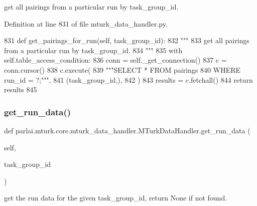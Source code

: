 \begin{DoxyVerb}get all pairings from a particular run by task_group_id.
\end{DoxyVerb}
 

Definition at line 831 of file mturk\+\_\+data\+\_\+handler.\+py.


\begin{DoxyCode}
831     \textcolor{keyword}{def }get\_pairings\_for\_run(self, task\_group\_id):
832         \textcolor{stringliteral}{"""}
833 \textcolor{stringliteral}{        get all pairings from a particular run by task\_group\_id.}
834 \textcolor{stringliteral}{        """}
835         with self.table\_access\_condition:
836             conn = self.\_get\_connection()
837             c = conn.cursor()
838             c.execute(
839                 \textcolor{stringliteral}{"""SELECT * FROM pairings}
840 \textcolor{stringliteral}{                         WHERE run\_id = ?;"""},
841                 (task\_group\_id,),
842             )
843             results = c.fetchall()
844             \textcolor{keywordflow}{return} results
845 
\end{DoxyCode}
\mbox{\label{classparlai_1_1mturk_1_1core_1_1mturk__data__handler_1_1MTurkDataHandler_a3ded92bcc9f19027c452489e2b06d837}} 
\subsubsection{\texorpdfstring{get\+\_\+run\+\_\+data()}{get\_run\_data()}}
{\footnotesize\ttfamily def parlai.\+mturk.\+core.\+mturk\+\_\+data\+\_\+handler.\+M\+Turk\+Data\+Handler.\+get\+\_\+run\+\_\+data (\begin{DoxyParamCaption}\item[{}]{self,  }\item[{}]{task\+\_\+group\+\_\+id }\end{DoxyParamCaption})}

\begin{DoxyVerb}get the run data for the given task_group_id, return None if not found.
\end{DoxyVerb}
 

